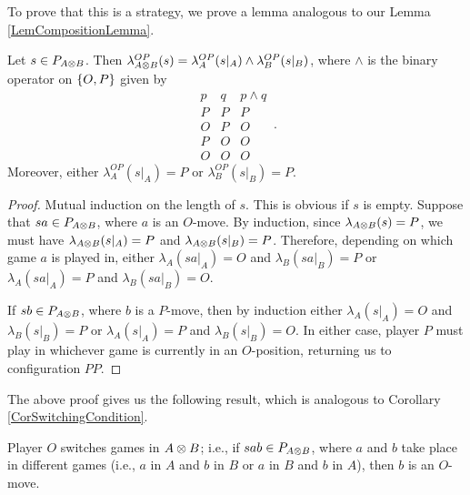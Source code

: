 \documentclass[11pt]{report}
\begin{document}
To prove that this is a strategy, we prove a lemma analogous to our Lemma \ref{LemCompositionLemma}.  

\begin{lemma}
  Let $s\in P_{A\otimes B}$.  
  Then $\lambda^{OP}_{A\otimes B}(s)=\lambda^{OP}_A(s\vert_A)\wedge\lambda^{OP}_B(s\vert_B)$, where $\wedge$ is the binary operator on $\{O,P\}$ given by
  \[
    \begin{array}{cc|c}
      p & q & p\wedge q \\
      \hline
      P & P & P \\
      O & P & O \\
      P & O & O \\
      O & O & O
    \end{array}\,.
    \]
  Moreover, either $\lambda_A^{OP}(s\vert_A)=P$ or $\lambda_B^{OP}(s\vert_B)=P$.
  \label{LemTensorAnalogue}
\end{lemma}
\begin{proof}
  Mutual induction on the length of $s$.  
  This is obvious if $s$ is empty.  
  Suppose that $sa\in P_{A\otimes B}$, where $a$ is an $O$-move.  
  By induction, since $\lambda_{A\otimes B}(s)=P$, we must have $\lambda_{A\otimes B}(s\vert_A)=P$ and $\lambda_{A\otimes B}(s\vert_B)=P$.  
  Therefore, depending on which game $a$ is played in, either $\lambda_A(sa\vert_A)=O$ and $\lambda_B(sa\vert_B)=P$ or $\lambda_A(sa\vert_A)=P$ and $\lambda_B(sa\vert_B)=O$.  

  If $sb\in P_{A\otimes B}$, where $b$ is a $P$-move, then by induction either $\lambda_A(s\vert_A)=O$ and $\lambda_B(s\vert_B)=P$ or $\lambda_A(s\vert_A)=P$ and $\lambda_B(s\vert_B)=O$.  
  In either case, player $P$ must play in whichever game is currently in an $O$-position, returning us to configuration $PP$.
\end{proof}

The above proof gives us the following result, which is analogous to Corollary \ref{CorSwitchingCondition}.

\begin{corollary}
  Player $O$ switches games in $A\otimes B$; i.e., if $sab\in P_{A\otimes B}$, where $a$ and $b$ take place in different games (i.e., $a$ in $A$ and $b$ in $B$ or $a$ in $B$ and $b$ in $A$), then $b$ is an $O$-move.
\end{corollary}
\end{document}
